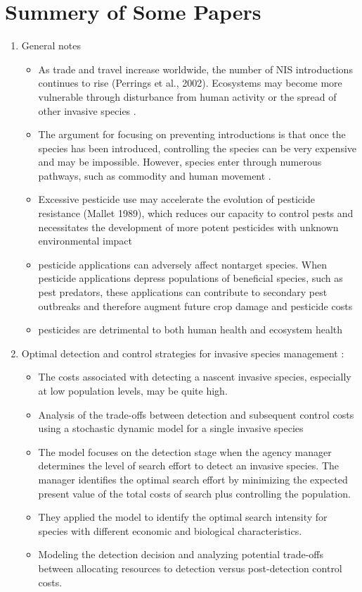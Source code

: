 \documentclass{article}
\theoremstyle{remark}
\theoremstyle{remark}
\theoremstyle{remark}
\theoremstyle{remark}
\theoremstyle{remark}
\theoremstyle{remark}
\begin{document}
\section{Summery of Some Papers}
\begin{enumerate}
 \item General notes
 	\begin{itemize}
 		\item As trade and travel increase worldwide, the number of NIS introductions continues to rise (Perrings et al., 2002). Ecosystems may become more vulnerable through disturbance from human activity or the spread of other invasive species \cite{MEHTA2007237}.
 		\item The argument for focusing on preventing introductions is that once the species has been introduced, controlling the species can be very expensive and may be impossible. However, species enter through numerous pathways, such as commodity and human movement \cite{MEHTA2007237}.
 		\item Excessive pesticide use may accelerate the evolution of pesticide resistance (Mallet 1989), which reduces our capacity to control pests and necessitates the development of more potent pesticides with unknown environmental impact
 		\item pesticide applications can adversely affect nontarget species. When pesticide applications depress populations of beneficial species, such as pest predators, these applications can contribute to secondary pest outbreaks and therefore augment future crop damage and pesticide costs
 		\item pesticides are detrimental to both human health and ecosystem health

	\end{itemize}

 \item Optimal detection and control strategies for invasive species management \cite{MEHTA2007237}:
 	\begin{itemize}
 		\item The costs associated with detecting a nascent invasive species, especially at low population levels, may be quite high.
 		\item Analysis of the trade-offs between detection and subsequent control costs using a stochastic dynamic model for a single invasive species
 		\item The model focuses on the detection stage when the agency manager determines the level of search effort to detect an invasive species. The manager identifies the optimal search effort by minimizing the expected present value of the total costs of search plus controlling the population.
 		\item They applied the model to identify the optimal search intensity for species with different economic and biological characteristics.
 		\item Modeling the detection decision and analyzing potential trade-offs between allocating resources to detection versus post-detection control costs.
	\end{itemize}


\end{enumerate}
\end{document}
